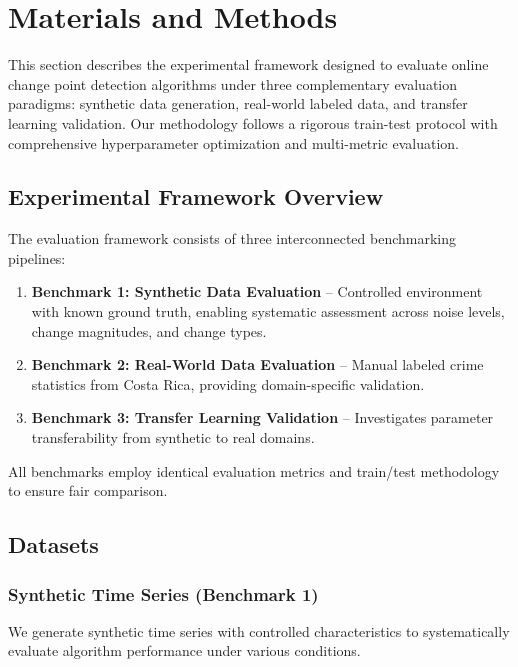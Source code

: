 \section{Materials and Methods}
\label{sec:methods}

This section describes the experimental framework designed to evaluate online change point detection algorithms under three complementary evaluation paradigms: synthetic data generation, real-world labeled data, and transfer learning validation. Our methodology follows a rigorous train-test protocol with comprehensive hyperparameter optimization and multi-metric evaluation.

\subsection{Experimental Framework Overview}

The evaluation framework consists of three interconnected benchmarking pipelines:

\begin{enumerate}
    \item \textbf{Benchmark 1: Synthetic Data Evaluation} -- Controlled environment with known ground truth, enabling systematic assessment across noise levels, change magnitudes, and change types.
    \item \textbf{Benchmark 2: Real-World Data Evaluation} -- Manual labeled crime statistics from Costa Rica, providing domain-specific validation.
    \item \textbf{Benchmark 3: Transfer Learning Validation} -- Investigates parameter transferability from synthetic to real domains.
\end{enumerate}

All benchmarks employ identical evaluation metrics and train/test methodology to ensure fair comparison.

\subsection{Datasets}

\subsubsection{Synthetic Time Series (Benchmark 1)}
\label{sec:synthetic_data}

We generate synthetic time series with controlled characteristics to systematically evaluate algorithm performance under various conditions.

